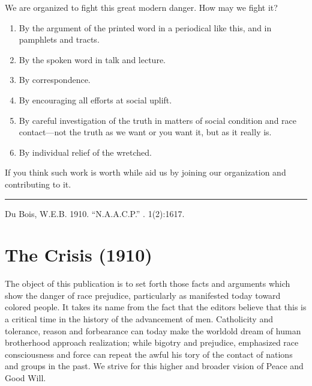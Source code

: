 \documentclass[letterpaper,10pt,english]{jupyterBook}
\begin{document}
\sphinxAtStartPar
We are organized to fight this great modern danger. How may we fight it?
\begin{enumerate}
%
\item {} 
\sphinxAtStartPar
By the argument of the printed word in a periodical like this, and in pamphlets and tracts.

\item {} 
\sphinxAtStartPar
By the spoken word in talk and lecture.

\item {} 
\sphinxAtStartPar
By correspondence.

\item {} 
\sphinxAtStartPar
By encouraging all efforts at social uplift.

\item {} 
\sphinxAtStartPar
By careful investigation of the truth in matters of social condition and race contact—not the truth as we want or you want it, but as it really is.

\item {} 
\sphinxAtStartPar
By individual relief of the wretched.

\end{enumerate}

\sphinxAtStartPar
If you think such work is worth while aid us by joining our organization and contributing to it.


\bigskip\hrule\bigskip


\sphinxAtStartPar
{} Du Bois, W.E.B. 1910. “N.A.A.C.P.”  . 1(2):16\sphinxhyphen{}17.


\section{The Crisis (1910)}
\label{\detokenize{Volumes/01/01/TheCrisis:the-crisis-1910}}\label{\detokenize{Volumes/01/01/TheCrisis::doc}}
\sphinxAtStartPar
The object of this publication is to set forth those facts and arguments which show the danger of race prejudice, particularly as manifested to\sphinxhyphen{}day toward colored people. It takes its name from the fact that the editors believe that this is a critical time in the history of the advancement of men. Catholicity and tolerance, reason and forbearance can to\sphinxhyphen{}day make the world\sphinxhyphen{}old dream of human brotherhood approach realization; while bigotry and prejudice, emphasized race consciousness and force can repeat the awful his tory of the contact of nations and groups in the past. We strive for this higher and broader vision of Peace and Good Will.
\end{document}
